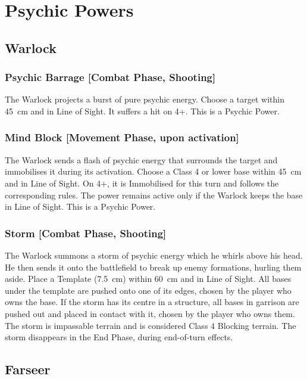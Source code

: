 \section{Psychic Powers}

\subsection{Warlock}

\subsubsection{Psychic Barrage [Combat Phase, Shooting]}

The Warlock projects a burst of pure psychic energy. Choose a target within 45~cm and in Line of Sight. It suffers a hit on 4+. This is a Psychic Power.

\subsubsection{Mind Block [Movement Phase, upon activation]}

The Warlock sends a flash of psychic energy that surrounds the target and immobilises it during its activation. Choose a Class 4 or lower base within 45~cm and in Line of Sight. On 4+, it is Immobilised for this turn and follows the corresponding rules. The power remains active only if the Warlock keeps the base in Line of Sight. This is a Psychic Power.

\subsubsection{Storm [Combat Phase, Shooting]}

The Warlock summons a storm of psychic energy which he whirls above his head. He then sends it onto the battlefield to break up enemy formations, hurling them aside. Place a Template (7.5~cm) within 60~cm and in Line of Sight. All bases under the template are pushed onto one of its edges, chosen by the player who owns the base. If the storm has its centre in a structure, all bases in garrison are pushed out and placed in contact with it, chosen by the player who owns them. The storm is impassable terrain and is considered Class 4 Blocking terrain. The storm disappears in the End Phase, during end-of-turn effects.

\subsection{Farseer}

